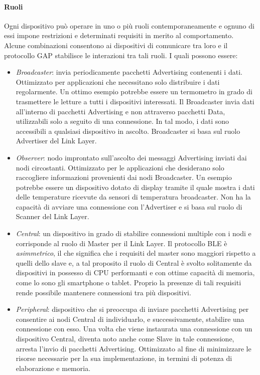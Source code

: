 \paragraph{Ruoli}
Ogni dispositivo può operare in uno o più ruoli contemporaneamente e ognuno di essi impone restrizioni e determinati requisiti in merito al comportamento. Alcune combinazioni consentono ai dispositivi di comunicare tra loro e il protocollo GAP stabilisce le interazioni tra tali ruoli. I quali possono essere:
\begin{itemize}
    \item \textit{Broadcaster}: invia periodicamente pacchetti Advertising contenenti i dati. Ottimizzato per applicazioni che necessitano solo distribuire i dati regolarmente. Un ottimo esempio potrebbe essere un termometro in grado di trasmettere le letture a tutti i dispositivi interessati. Il Broadcaster invia dati all'interno di pacchetti Advertising e non attraverso pacchetti Data, utilizzabili solo a seguito di una connessione. In tal modo, i dati sono accessibili a qualsiasi dispositivo in ascolto. Broadcaster si basa sul ruolo Advertiser del Link Layer.
    
    \item \textit{Observer}: nodo improntato sull'ascolto dei messaggi Advertising inviati dai nodi circostanti. Ottimizzato per le applicazioni che desiderano solo raccogliere informazioni provenienti dai nodi Broadcaster. Un esempio potrebbe essere un dispositivo dotato di display tramite il quale mostra i dati delle temperature ricevute da sensori di temperatura broadcaster.  Non ha la capacità di avviare una connessione con l'Advertiser e si basa sul ruolo di Scanner del Link Layer.
    
    \item \textit{Central}: un dispositivo in grado di stabilire connessioni multiple con i nodi e corrisponde al ruolo di Master per il Link Layer. Il protocollo BLE è \textit{asimmetrico}, il che significa che i requisiti del master sono maggiori rispetto a quelli dello slave e, a tal proposito il ruolo di Central è svolto solitamente da dispositivi in possesso di CPU performanti e con ottime capacità di memoria, come lo sono gli smartphone o tablet. Proprio la presenze di tali requisiti rende possibile mantenere connessioni tra più dispositivi. 
    
    \item \textit{Peripheral}: dispositivo che si preoccupa di inviare pacchetti Advertising per consentire ai nodi Central di individuarlo, e successivamente, stabilire una connessione con esso. Una volta che viene instaurata una connessione con un dispositivo Central, diventa noto anche come Slave in tale connessione, arresta l'invio di pacchetti Advertising. Ottimizzato al fine di minimizzare le risorse necessarie per la sua implementazione, in termini di potenza di elaborazione e memoria.
\end{itemize}

